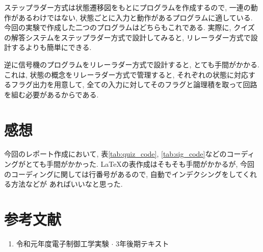 \documentclass[titlepage]{jsarticle}
\begin{document}
  ステップラダー方式は状態遷移図をもとにプログラムを作成するので,
  一連の動作があるわけではない, 状態ごとに入力と動作があるプログラムに適している.
  今回の実験で作成した二つのプログラムはどちらもこれである.
  実際に, クイズの解答システムをステップラダー方式で設計してみると,
  リレーラダー方式で設計するよりも簡単にできる.

  逆に信号機のプログラムをリレーラダー方式で設計すると,
  とても手間がかかる.
  これは, 状態の概念をリレーラダー方式で管理すると,
  それぞれの状態に対応するフラグ出力を用意して,
  全ての入力に対してそのフラグと論理積を取って回路を組む必要があるからである.
\section{感想}
  今回のレポート作成において,
  表\ref{tab:quiz_code}, \ref{tab:sig_code}などのコーディングがとても手間がかかった.
  \LaTeX の表作成はそもそも手間がかかるが,
  今回のコーディングに関しては行番号があるので, 自動でインデクシングをしてくれる方法などが
  あればいいなと思った.
\section*{参考文献}
  \begin{enumerate}
    \item 令和元年度電子制御工学実験 $\cdot$ 3年後期テキスト
  \end{enumerate}
\end{document}
